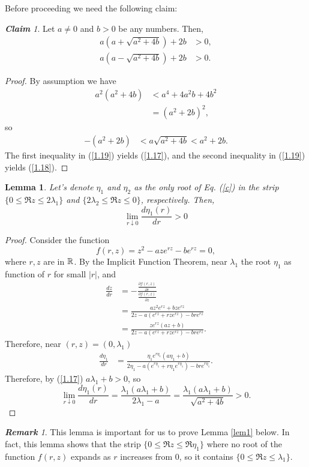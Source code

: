 \documentclass[12pt,letterpaper]{amsart}
\newtheorem{lemma}[theorem]{Lemma}
\theoremstyle{definition}
\theoremstyle{remark}
\newtheorem{remark}[theorem]{{\bf Remark}}
\newtheorem{claim}[theorem]{{\bf Claim}}
\numberwithin{equation}{section}
\begin{document}
Before proceeding we need the following claim:
\begin{claim}\label{cla 1}
Let $a\not=0$ and $b>0$ be any numbers. Then,
\begin{align}
a(a+\sqrt{a^2+4b})+2b &> 0,\label{1.17}\\
a(a-\sqrt{a^2+4b})+2b &>0 .\label{1.18}
\end{align}
\end{claim}
\begin{proof}
By assumption we have
\begin{align*}
 a^2(a^2+4b)& < a^4+4a^2b+4b^2 \\
 &= (a^2+2b)^2 ,
\end{align*}
so
\begin{align}\label{1.19}
 -(a^2+2b) &<  a\sqrt{a^2+4b} <a^2+2b.
\end{align}
The first inequality in (\ref{1.19}) yields (\ref{1.17}), and the second inequality in (\ref{1.19}) yields (\ref{1.18}).
\end{proof}
\begin{lemma}\label{lem 1.3}
Let's denote $\eta_1$ and $\eta_2$ as the only root of Eq. (\ref{c}) in the strip $\{ 0\le \Re z \le 2\lambda_1\}$ and $\{2\lambda_2 \le \Re z \le 0\}$, respectively. Then,
$$
\lim_{r\downarrow 0}  \frac{ d\eta _1 (r)}{dr}>0
$$
\end{lemma}
\begin{proof}
Consider the function
$$
f(r,z)=z^2-aze^{rz}-be^{rz}=0,
$$
where $r,z$ are in $\mathbb R$.
By the Implicit Function Theorem, near $\lambda_{1}$ the root $\eta_1$ as function of $r$ for small $|r|$, and 
\begin{align*}
\frac{dz}{dr} &=-\frac{\frac{\partial f(r,z)}{\partial r}}{\frac{\partial f(r,z)}{\partial z}} \\
& =\frac{az^2 e^{rz}+bze^{rz} }{ 2z-a(e^{rz}+rze^{rz})-bre^{rz}}\\
&= \frac{ze^{rz}(az+b) }{ 2z-a(e^{rz}+rze^{rz})-bre^{rz}}.
\end{align*}
Therefore, near $(r,z)=(0,\lambda_1)$
\begin{align}
\frac{d\eta_1 }{dr}
&= \frac{\eta_1e^{r\eta_1}(a\eta_1+b)}{2\eta_1 -a (e^{r\eta_1}+r\eta_1 e^{r\eta_1})-bre^{r\eta_1}}\nonumber .
\end{align}
Therefore, by (\ref{1.17})  $a\lambda_1+b >0$, so
$$
\lim_{r\downarrow 0}  \frac{ d\eta _1 (r)}{dr}=\frac{\lambda_1(a\lambda_1+b)}{2\lambda_1 -a}=\frac{\lambda_1(a\lambda_1+b)}{\sqrt{a^2+4b}} >0.
$$

\end{proof}
\begin{remark}
This lemma is important for us to prove Lemma \ref{lem1} below. In fact, this lemma shows that the strip $\{ 0 \le \Re z \le \Re \eta_1\}$ where  no root of the function $f(r,z)$  expands as $r$ increases from $0$, so it contains $\{ 0\le \Re z \le \lambda_1\}$.
\end{remark}
 
\end{document}
